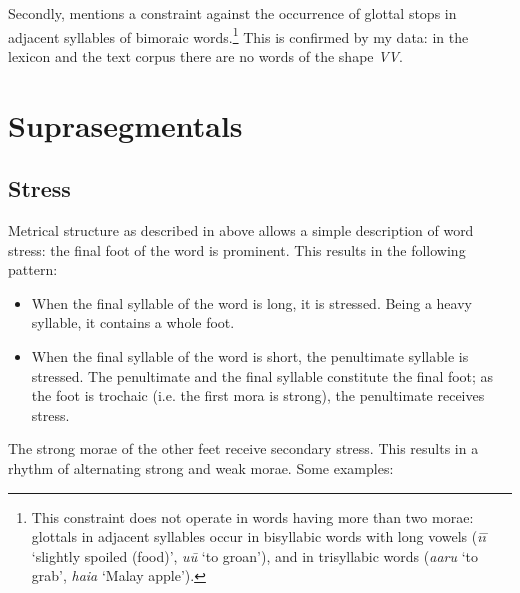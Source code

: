 

\clearpage 
Secondly, \citet{Davletshin2015} mentions a constraint against the occurrence of glottal stops in adjacent syllables of bimoraic words.\footnote{\label{fn:57}This constraint does not operate in words having more than two morae: glottals in adjacent syllables occur in bisyllabic words with long vowels (\textit{{\ꞌ}ī{\ꞌ}ī} ‘slightly spoiled (food)’, \textit{{\ꞌ}u{\ꞌ}ū} ‘to groan’), and in trisyllabic words (\textit{{\ꞌ}a{\ꞌ}aru} ‘to grab’, \textit{ha{\ꞌ}i{\ꞌ}a} ‘Malay apple’).} This is confirmed by my data: in the lexicon and the text corpus there are no words of the shape \textit{{\ꞌ}V{\ꞌ}V}.

\section{Suprasegmentals}\label{sec:2.4}
\subsection{Stress}\label{sec:2.4.1}
Metrical structure as described in  above allows a simple description of word stress: the final foot of the word is prominent. This results in the following pattern:

\begin{itemize}
\item 
When the final syllable of the word is long, it is stressed. Being a heavy syllable, it contains a whole foot.

\item 
When the final syllable of the word is short, the penultimate syllable is stressed. The penultimate and the final syllable constitute the final foot; as the foot is trochaic (i.e. the first mora is strong), the penultimate receives stress. 

\end{itemize}

The strong morae of the other feet receive secondary stress. This results in a rhythm of alternating strong and weak morae. Some examples:

